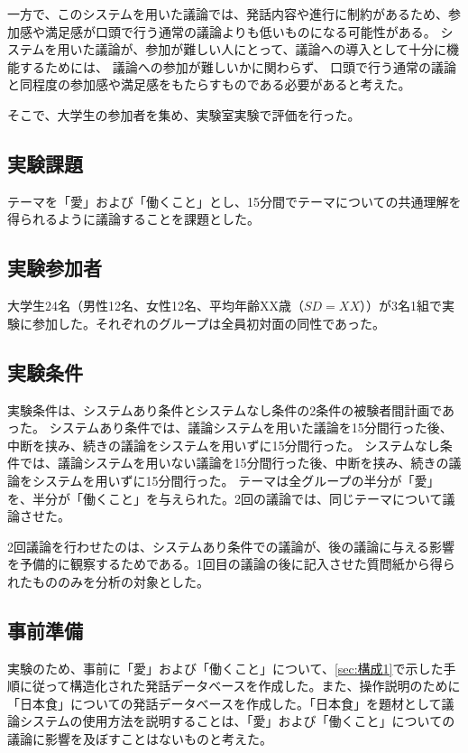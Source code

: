 \documentclass[11pt, a4paper]{jreport} %
\begin{document}
一方で、このシステムを用いた議論では、発話内容や進行に制約があるため、参加感や満足感が口頭で行う通常の議論よりも低いものになる可能性がある。
システムを用いた議論が、参加が難しい人にとって、議論への導入として十分に機能するためには、
議論への参加が難しいかに関わらず、
口頭で行う通常の議論と同程度の参加感や満足感をもたらすものである必要があると考えた。

そこで、大学生の参加者を集め、実験室実験で評価を行った。

\subsection{実験課題}
テーマを「愛」および「働くこと」とし、15分間でテーマについての共通理解を得られるように議論することを課題とした。


\subsection{実験参加者}
大学生24名（男性12名、女性12名、平均年齢XX歳（$SD=XX$））が3名1組で実験に参加した。それぞれのグループは全員初対面の同性であった。

\subsection{実験条件}
実験条件は、システムあり条件とシステムなし条件の2条件の被験者間計画であった。
システムあり条件では、議論システムを用いた議論を15分間行った後、中断を挟み、続きの議論をシステムを用いずに15分間行った。
システムなし条件では、議論システムを用いない議論を15分間行った後、中断を挟み、続きの議論をシステムを用いずに15分間行った。
テーマは全グループの半分が「愛」を、半分が「働くこと」を与えられた。2回の議論では、同じテーマについて議論させた。


2回議論を行わせたのは、システムあり条件での議論が、後の議論に与える影響を予備的に観察するためである。1回目の議論の後に記入させた質問紙から得られたもののみを分析の対象とした。

\subsection{事前準備}
実験のため、事前に「愛」および「働くこと」について、\ref{sec:構成1}で示した手順に従って構造化された発話データベースを作成した。また、操作説明のために「日本食」についての発話データべースを作成した。「日本食」を題材として議論システムの使用方法を説明することは、「愛」および「働くこと」についての議論に影響を及ぼすことはないものと考えた。
\end{document}
